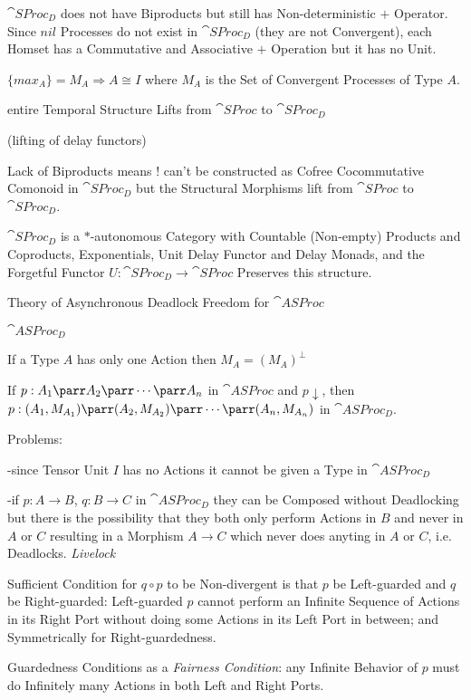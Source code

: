 $\cat{SProc}_D$ does not have Biproducts but still has
Non-deterministic $+$ Operator. Since $nil$ Processes do not exist in
$\cat{SProc}_D$ (they are not Convergent), each Homset has a
Commutative and Associative $+$ Operation but it has no Unit.

$\{max_A\} = M_A \Rightarrow A \cong I$ where $M_A$ is the Set of
Convergent Processes of Type $A$. %

entire Temporal Structure Lifts from $\cat{SProc}$ to $\cat{SProc}_D$

(lifting of delay functors) %

Lack of Biproducts means $!$ can't be constructed as Cofree
Cocommutative Comonoid in $\cat{SProc}_D$ but the Structural Morphisms
lift from $\cat{SProc}$ to $\cat{SProc}_D$. %

$\cat{SProc}_D$ is a $*$-autonomous Category with Countable
(Non-empty) Products and Coproducts, Exponentials, Unit Delay Functor
and Delay Monads, and the Forgetful Functor $U : \cat{SProc}_D
\rightarrow \cat{SProc}$ Preserves this structure.

Theory of Asynchronous Deadlock Freedom for $\cat{ASProc}$ %

$\cat{ASProc}_D$

If a Type $A$ has only one Action then $M_A = (M_A)^\bot$

If $p : A_1 \parr A_2 \parr \cdots \parr A_n$ in $\cat{ASProc}$ and
$p\downarrow$, then $p:(A_1,M_{A_1}) \parr (A_2,M_{A_2}) \parr \cdots
\parr (A_n,M_{A_n})$ in $\cat{ASProc}_D$.

Problems: %

-since Tensor Unit $I$ has no Actions it cannot be given a Type in
$\cat{ASProc}_D$

-if $p : A \rightarrow B$, $q : B \rightarrow C$ in $\cat{ASProc}_D$
they can be Composed without Deadlocking but there is the possibility
that they both only perform Actions in $B$ and never in $A$ or $C$
resulting in a Morphism $A \rightarrow C$ which never does anyting in
$A$ or $C$, i.e. Deadlocks. \emph{Livelock} %

Sufficient Condition for $q \circ p$ to be Non-divergent is that $p$
be Left-guarded and $q$ be Right-guarded: Left-guarded $p$ cannot
perform an Infinite Sequence of Actions in its Right Port without
doing some Actions in its Left Port in between; and Symmetrically for
Right-guardedness.

Guardedness Conditions as a \emph{Fairness Condition}: any Infinite
Behavior of $p$ must do Infinitely many Actions in both Left and Right
Ports.

